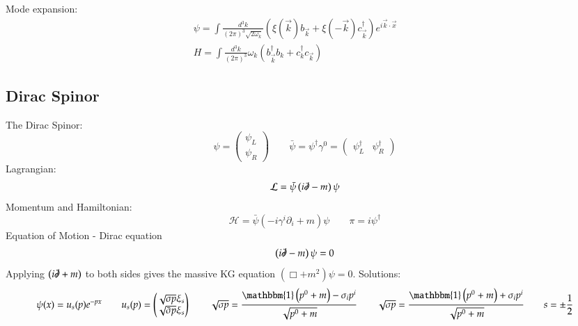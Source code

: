 \documentclass{article}
\begin{document}
Mode expansion:
\begin{equation*}
\begin{gathered}
    \psi = \int \frac{d^3k}{(2\pi)^3\sqrt{2\omega_k}}
    \left(
        \xi(\vec{k}) b_{\vec{k}} + \xi(-\vec{k}) c_{\vec{k}}^\dagger
    \right)e^{i\vec{k}\cdot\vec{x}}
    \qquad
    \\
    H = \int \frac{d^3k}{(2\pi)^3} \omega_k \left(
        b_{\vec{k}}^\dagger b_{k} + c_{k}^\dagger c_{\vec{k}}
    \right)
\end{gathered}
\end{equation*}
\subsection{Dirac Spinor}
The Dirac Spinor:
\begin{equation*}
    \psi = \begin{pmatrix}
        \psi_L \\ \psi_R
    \end{pmatrix}
    \qquad
    \bar{\psi} = \psi^\dagger \gamma^0 = \begin{pmatrix}
        \psi_L^\dagger & \psi_R^\dagger
    \end{pmatrix}
\end{equation*}
Lagrangian:
\begin{equation*}
    \mathcal{L} = \bar{\psi}\left(i\slashed{\partial} - m\right)\psi
\end{equation*}
Momentum and Hamiltonian:
\begin{equation*}
    \mathcal{H} = \bar{\psi}\left(-i\gamma^i \partial_i + m\right)\psi
    \qquad
    \pi = i \psi^\dagger
\end{equation*}
Equation of Motion - Dirac equation
\begin{equation*}
    \left(i\slashed{\partial} - m\right)\psi = 0
\end{equation*}
Applying $\left(i\slashed{\partial} + m\right)$ to both sides gives the massive KG equation $\left(\Box + m^2\right)\psi = 0$.
\newline
Solutions:
\begin{equation*}
    \psi(x) = u_s(p) e^{-px}
    \qquad
    u_s(p) = \begin{pmatrix}
        \sqrt{\sigma p} \xi_s \\ \sqrt{\bar{\sigma} p} \xi_s
    \end{pmatrix}
    \qquad
    \sqrt{\sigma p} = \frac{\mathbbm{1}\left(p^0 + m\right) - \sigma_i p^i}{\sqrt{p^0 + m}}
    \qquad
    \sqrt{\sigma p} = \frac{\mathbbm{1}\left(p^0 + m\right) + \sigma_i p^i}{\sqrt{p^0 + m}}
    \qquad
    s = \pm\frac{1}{2}
\end{equation*}
\end{document}
